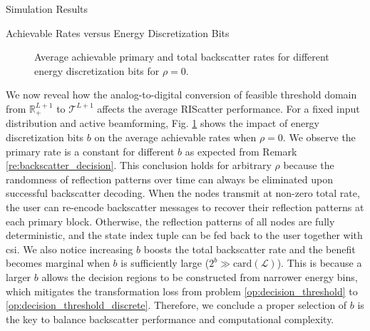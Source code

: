 \documentclass[journal]{IEEEtran}
\begin{document}
\begin{section}{Simulation Results}
	\begin{subsection}{Achievable Rates versus Energy Discretization Bits}
		\begin{figure}[!t]
			\caption{Average achievable primary and total backscatter rates for different energy discretization bits for $\rho=0$.}
			\label{fi:rate_bits}
		\end{figure}
		We now reveal how the analog-to-digital conversion of feasible threshold domain from $\mathbb{R}_+^{L+1}$ to $\mathcal{T}^{L+1}$ affects the average RIScatter performance.
		For a fixed input distribution and active beamforming, Fig. \ref{fi:rate_bits} shows the impact of energy discretization bits $b$ on the average achievable rates when $\rho=0$.
		We observe the primary rate is a constant for different $b$ as expected from Remark \ref{re:backscatter_decision}.
		This conclusion holds for arbitrary $\rho$ because the randomness of reflection patterns over time can always be eliminated upon successful backscatter decoding.
		When the nodes transmit at non-zero total rate, the user can re-encode backscatter messages to recover their reflection patterns at each primary block.
		Otherwise, the reflection patterns of all nodes are fully deterministic, and the state index tuple can be fed back to the user together with \gls{csi}.
		We also notice increasing $b$ boosts the total backscatter rate and the benefit becomes marginal when $b$ is sufficiently large ($2^b \gg \mathrm{card}(\mathcal{L})$).
		This is because a larger $b$ allows the decision regions to be constructed from narrower energy bins, which mitigates the transformation loss from problem \eqref{op:decision_threshold} to \eqref{op:decision_threshold_discrete}.
		Therefore, we conclude a proper selection of $b$ is the key to balance backscatter performance and computational complexity.
	\end{subsection}


\end{section}
\end{document}
